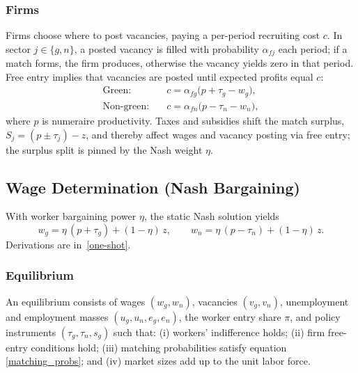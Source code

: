 \documentclass[preprint,12pt]{elsarticle}
\begin{document}
\subsubsection{Firms}
Firms choose where to post vacancies, paying a per-period recruiting cost $c$. In sector $j\in\{g,n\}$, a posted vacancy is filled with probability $\alpha_{fj}$ each period; if a match forms, the firm produces, otherwise the vacancy yields zero in that period. Free entry implies that vacancies are posted until expected profits equal $c$:
\begin{align*}
  \text{Green:}\quad & c = \alpha_{fg}\bigl(p+\tau_g-w_g\bigr),\\
  \text{Non-green:}\quad & c = \alpha_{fn}\bigl(p-\tau_n-w_n\bigr),
\end{align*}
where $p$ is numeraire productivity. Taxes and subsidies shift the match surplus, $S_j=(p\pm\tau_j)-z$, and thereby affect wages and vacancy posting via free entry; the surplus split is pinned by the Nash weight $\eta$.


\subsection{Wage Determination (Nash Bargaining)}

With worker bargaining power $\eta$, the static Nash solution yields
\[
  w_g=\eta\,(p+\tau_g)+(1-\eta)\,z,\qquad
  w_n=\eta\,(p-\tau_n)+(1-\eta)\,z.
\]
Derivations are in~\ref{one-shot}.

\subsubsection{Equilibrium}

An equilibrium consists of wages $(w_g,w_n)$, vacancies $(v_g,v_n)$, unemployment and employment masses $(u_g,u_n,e_g,e_n)$, the worker entry share $\pi$, and policy instruments $(\tau_g,\tau_n,s_g)$ such that: (i) workers’ indifference holds; (ii) firm free-entry conditions hold; (iii) matching probabilities satisfy equation \eqref{matching_probs}; and (iv) market sizes add up to the unit labor force.
\end{document}
